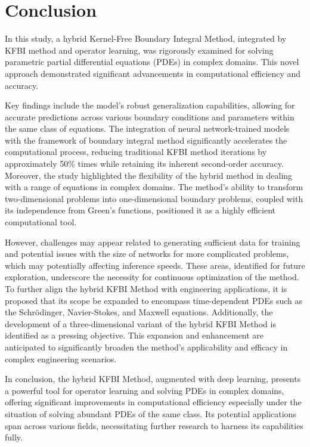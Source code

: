 \documentclass{article}
\begin{document}
\section{Conclusion} \label{Conclusion}

In this study, a hybrid Kernel-Free Boundary Integral Method, integrated by KFBI method and operator learning, was rigorously examined for solving parametric partial differential equations (PDEs) in complex domains. This novel approach demonstrated significant advancements in computational efficiency and accuracy.

Key findings include the model's robust generalization capabilities, allowing for accurate predictions across various boundary conditions and parameters within the same class of equations. The integration of neural network-trained models with the framework of boundary integral method significantly accelerates the computational process, reducing traditional KFBI method iterations by approximately 50\% times while retaining its inherent second-order accuracy. Moreover, the study highlighted the flexibility of the hybrid method in dealing with a range of equations in complex domains. The method's ability to transform two-dimensional problems into one-dimensional boundary problems, coupled with its independence from Green's functions, positioned it as a highly efficient computational tool.

However, challenges may appear related to generating sufficient data for training and potential issues with the size of networks for more complicated problems, which may potentially affecting inference speeds. These areas, identified for future exploration, underscore the necessity for continuous optimization of the method. To further align the hybrid KFBI Method with engineering applications, it is proposed that its scope be expanded to encompass time-dependent PDEs such as the Schrödinger, Navier-Stokes, and Maxwell equations. Additionally, the development of a three-dimensional variant of the hybrid KFBI Method is identified as a pressing objective. This expansion and enhancement are anticipated to significantly broaden the method's applicability and efficacy in complex engineering scenarios.

In conclusion, the hybrid KFBI Method, augmented with deep learning, presents a powerful tool for operator learning and solving PDEs in complex domains, offering significant improvements in computational efficiency especially under the situation of solving abundant PDEs of the same class. Its potential applications span across various fields, necessitating further research to harness its capabilities fully.
\end{document}
